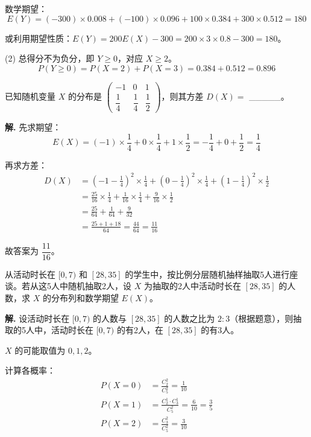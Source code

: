 \documentclass[11pt]{ctexrep}
\begin{document}
数学期望：
\[
E(Y) = (-300) \times 0.008 + (-100) \times 0.096 + 100 \times 0.384 + 300 \times 0.512 = 180
\]

或利用期望性质：$E(Y) = 200E(X) - 300 = 200 \times 3 \times 0.8 - 300 = 180$。

(2) 总得分不为负分，即 $Y \ge 0$，对应 $X \ge 2$。
\[
P(Y \ge 0) = P(X = 2) + P(X = 3) = 0.384 + 0.512 = 0.896
\]

\begin{realexam}[2024 上海春考]
    已知随机变量 $X$ 的分布是 $\begin{pmatrix} -1 & 0 & 1 \\ \dfrac{1}{4} & \dfrac{1}{4} & \dfrac{1}{2} \end{pmatrix}$，则其方差 $D(X) =$ \_\_\_\_\_。
\end{realexam}

\textbf{解.} 先求期望：
\[
E(X) = (-1) \times \frac{1}{4} + 0 \times \frac{1}{4} + 1 \times \frac{1}{2} = -\frac{1}{4} + 0 + \frac{1}{2} = \frac{1}{4}
\]

再求方差：
\begin{align*}
D(X) &= \left(-1 - \frac{1}{4}\right)^2 \times \frac{1}{4} + \left(0 - \frac{1}{4}\right)^2 \times \frac{1}{4} + \left(1 - \frac{1}{4}\right)^2 \times \frac{1}{2} \\
&= \frac{25}{16} \times \frac{1}{4} + \frac{1}{16} \times \frac{1}{4} + \frac{9}{16} \times \frac{1}{2} \\
&= \frac{25}{64} + \frac{1}{64} + \frac{9}{32} \\
&= \frac{25 + 1 + 18}{64} = \frac{44}{64} = \frac{11}{16}
\end{align*}

故答案为 $\dfrac{11}{16}$。

\begin{realexam}[2026 崇明二模]
    从活动时长在 $[0, 7)$ 和 $[28, 35]$ 的学生中，按比例分层随机抽样抽取5人进行座谈。若从这5人中随机抽取2人，设 $X$ 为抽取的2人中活动时长在 $[28, 35]$ 的人数，求 $X$ 的分布列和数学期望 $E(X)$。
\end{realexam}

\textbf{解.} 设活动时长在 $[0, 7)$ 的人数与 $[28, 35]$ 的人数之比为 $2:3$（根据题意），则抽取的5人中，活动时长在 $[0, 7)$ 的有2人，在 $[28, 35]$ 的有3人。

$X$ 的可能取值为 $0, 1, 2$。

计算各概率：
\begin{align*}
P(X = 0) &= \frac{C_2^2}{C_5^2} = \frac{1}{10} \\
P(X = 1) &= \frac{C_2^1 \cdot C_3^1}{C_5^2} = \frac{6}{10} = \frac{3}{5} \\
P(X = 2) &= \frac{C_3^2}{C_5^2} = \frac{3}{10}
\end{align*}
\end{document}
